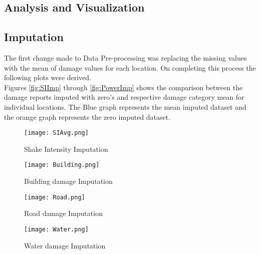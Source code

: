 \documentclass[12pt]{extarticle}
\begin{document}
\begin{centering}
    \section{Analysis and Visualization}
\end{centering}
\subsection{Imputation}
The first change made to Data Pre-processing was replacing the missing values with the mean of damage values for each location. On completing this process the following plots were derived. \\

Figures \ref{fig:SIImp} through \ref{fig:PowerImp} shows the comparison between the damage reports imputed with zero's and respective damage category mean for individual locations. The Blue graph represents the mean imputed dataset and the orange graph represents the zero imputed dataset.\\

\begin{figure}[H]
	\centering
	\begin{minipage}{0.5\textwidth}
		\centering
		\texttt{[image: SIAvg.png]}
		\caption{Shake Intensity Imputation}
		\label{fig:SIImp}
	\end{minipage}%
	\begin{minipage}{0.5\textwidth}
		\centering
		\texttt{[image: Building.png]}
		\caption{Building damage Imputation}
		\label{fig:BuildingImp}
	\end{minipage}
\end{figure} 


\begin{figure}[H]
	\centering
	\begin{minipage}{0.5\textwidth}
		\centering
		\texttt{[image: Road.png]}
		\caption{Road damage Imputation}
		\label{fig:RoadImp}
	\end{minipage}%
	\begin{minipage}{0.5\textwidth}
		\centering
		\texttt{[image: Water.png]}
		\caption{Water damage Imputation}
		\label{fig:WaterImp}
	\end{minipage}
\end{figure} 
\end{document}
